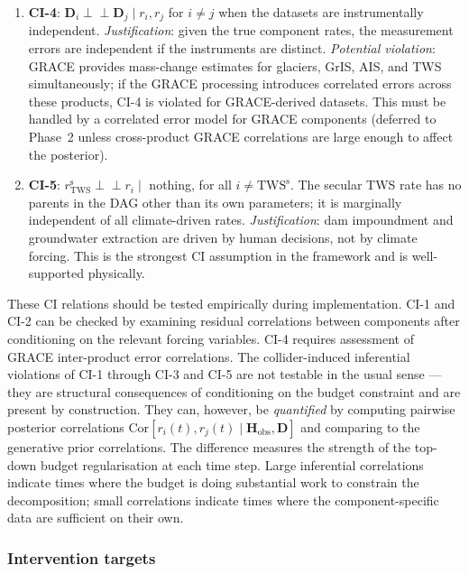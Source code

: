 \documentclass[11pt]{article}
\begin{document}
\begin{enumerate}
  \item \textbf{CI-4}: $\mathbf{D}_i \perp\!\!\!\perp \mathbf{D}_j \mid r_i, r_j$ for $i \neq j$ when the datasets are instrumentally independent.  \emph{Justification}: given the true component rates, the measurement errors are independent if the instruments are distinct.  \emph{Potential violation}: GRACE provides mass-change estimates for glaciers, GrIS, AIS, and TWS simultaneously; if the GRACE processing introduces correlated errors across these products, CI-4 is violated for GRACE-derived datasets.  This must be handled by a correlated error model for GRACE components (deferred to Phase~2 unless cross-product GRACE correlations are large enough to affect the posterior).

  \item \textbf{CI-5}: $r_{\text{TWS}}^{\text{s}} \perp\!\!\!\perp r_i \mid$ nothing, for all $i \neq \text{TWS}^{\text{s}}$.  The secular TWS rate has no parents in the DAG other than its own parameters; it is marginally independent of all climate-driven rates.  \emph{Justification}: dam impoundment and groundwater extraction are driven by human decisions, not by climate forcing.  This is the strongest CI assumption in the framework and is well-supported physically.
\end{enumerate}

\noindent These CI relations should be tested empirically during implementation.  CI-1 and CI-2 can be checked by examining residual correlations between components after conditioning on the relevant forcing variables.  CI-4 requires assessment of GRACE inter-product error correlations.  The collider-induced inferential violations of CI-1 through CI-3 and CI-5 are not testable in the usual sense --- they are structural consequences of conditioning on the budget constraint and are present by construction.  They can, however, be \emph{quantified} by computing pairwise posterior correlations $\text{Cor}[r_i(t), r_j(t) \mid \mathbf{H}_{\text{obs}}, \mathbf{D}]$ and comparing to the generative prior correlations.  The difference measures the strength of the top-down budget regularisation at each time step.  Large inferential correlations indicate times where the budget is doing substantial work to constrain the decomposition; small correlations indicate times where the component-specific data are sufficient on their own.

\subsubsection{Intervention targets}
\label{sec:interventions}
\end{document}
